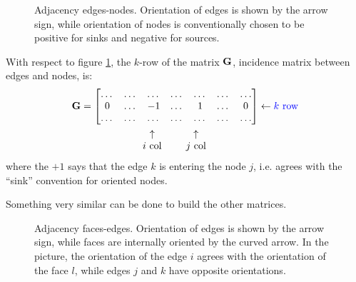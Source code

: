 \begin{figure}[htbp]
  \begin{center}
    \resizebox{4cm}{!}{}
  \end{center}
  \caption{Adjacency edges-nodes. Orientation of edges is shown by the
    arrow sign, while orientation of nodes is conventionally chosen to
    be positive for sinks and negative for sources.}
  \label{fig:adiacency_e_n}
\end{figure}

With respect to figure \ref{fig:adiacency_e_n}, the $k$-row of the matrix
$\mathbf{G}$, incidence matrix between edges and nodes, is:
\begin{align*}
  \Matrix{G} & = \begin{bmatrix}
    \dots & \dots & \dots  & \dots & \dots & \dots & \dots \\
    0     & \dots & -1     & \dots & 1     & \dots & 0     \\
    \dots & \dots & \dots  & \dots & \dots & \dots & \dots
  \end{bmatrix} \leftarrow \text{\color[rgb]{0,0,1}$k$ row} \\
  & \quad \begin{matrix}
    \qquad & \qquad & \mspace{-14mu}\uparrow       & \qquad & \mspace{-28mu}\uparrow       \\
    \qquad & \qquad & \mspace{-14mu}\text{$i$ col} & \qquad & \mspace{-28mu}\text{$j$ col}
  \end{matrix}
\end{align*}
where the $+1$ says that the edge $k$ is entering the node $j$,
i.e. agrees with the ``sink'' convention for oriented nodes.

Something very similar can be done to build the other matrices.

\begin{figure}[htbp]
  \begin{center}
    \resizebox{4cm}{!}{}
  \end{center}
  \caption{Adjacency faces-edges. Orientation of edges is shown by the
    arrow sign, while faces are internally oriented by the curved
    arrow. In the picture, the orientation of the edge $i$ agrees with
    the orientation of the face $l$, while edges $j$ and $k$ have
    opposite orientations.}
  \label{fig:adiacency_f_e}
\end{figure}

